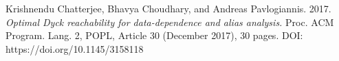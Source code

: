 \documentclass[12pt]{article}  %
\theoremstyle{definition}
\theoremstyle{remark}
\begin{document}
\begin{thebibliography}{9}

Krishnendu Chatterjee, Bhavya Choudhary, and Andreas Pavlogiannis. 
2017. 
\emph{Optimal Dyck reachability for data-dependence and alias analysis.}
Proc. ACM Program. Lang. 2, POPL, Article 30 (December 2017), 30 pages. DOI: 
https://doi.org/10.1145/3158118




\end{thebibliography}
\end{document}
